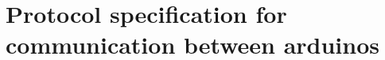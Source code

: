 \documentclass[conference, a4paper]{IEEEtran}
\begin{document}

%





%
%
%


\appendices

\section{Protocol specification for communication between arduinos}
\label{prot_ard}
\end{document}
